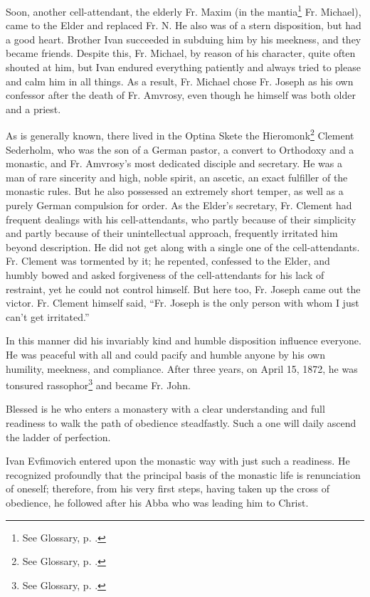 Soon, another cell-attendant, the elderly Fr. Maxim (in the mantia\footnote{See Glossary, p. \pageref{mantia}.} Fr. Michael), came to the Elder and replaced Fr. N. He also was of a stern disposition, but had a good heart. Brother Ivan succeeded in subduing him by his meekness, and they became friends. Despite this, Fr. Michael, by reason of his character, quite often shouted at him, but Ivan endured everything patiently and always tried to please and calm him in all things. As a result, Fr. Michael chose Fr. Joseph as his own confessor after the death of Fr. Amvrosy, even though he himself was both older and a priest.

As is generally known, there lived in the Optina Skete the Hieromonk\footnote{See Glossary, p. \pageref{hieromonk}.} Clement Sederholm, who was the son of a German pastor, a convert to Orthodoxy and a monastic, and Fr. Amvrosy's most dedicated disciple and secretary. He was a man of rare sincerity and high, noble spirit, an ascetic, an exact fulfiller of the monastic rules. But he also possessed an extremely short temper, as well as a purely German compulsion for order. As the Elder's secretary, Fr. Clement had frequent dealings with his cell-attendants, who partly because of their simplicity and partly because of their unintellectual approach, frequently irritated him beyond description. He did not get along with a single one of the cell-attendants. Fr. Clement was tormented by it; he repented, confessed to the Elder, and humbly bowed and asked forgiveness of the cell-attendants for his lack of restraint, yet he could not control himself. But here too, Fr. Joseph came out the victor. Fr. Clement himself said, “Fr. Joseph is the only person with whom I just can't get irritated.”

In this manner did his invariably kind and humble disposition influence everyone. He was peaceful with all and could pacify and humble anyone by his own humility, meekness, and compliance. After three years, on April 15, 1872, he was tonsured rassophor\footnote{See Glossary, p. \pageref{rassophor}.} and became Fr. John.

Blessed is he who enters a monastery with a clear understanding and full readiness to walk the path of obedience steadfastly. Such a one will daily ascend the ladder of perfection.

Ivan Evfimovich entered upon the monastic way with just such a readiness. He recognized profoundly that the principal basis of the monastic life is renunciation of oneself; therefore, from his very first steps, having taken up the cross of obedience, he followed after his Abba who was leading him to Christ.

